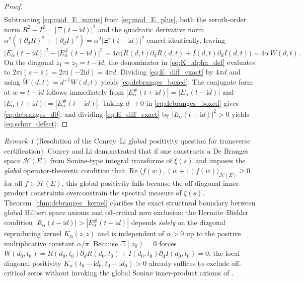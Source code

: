 \documentclass[11pt,reqno,a4paper]{amsart}
\theoremstyle{plain}
\theoremstyle{definition}
\theoremstyle{remark}
\newtheorem{remark}[theorem]{Remark}
\numberwithin{equation}{section}
\newcommand{\ii}{\mathrm{i}}
\begin{document}
\begin{proof}
\begin{align}
\end{align}
Subtracting \eqref{eq:mod_E_minus} from \eqref{eq:mod_E_plus}, both the zeroth-order norm $R^2 + I^2 = |\Xi(t-\ii d)|^2$ and the quadratic derivative norm $\alpha^2((\partial_d R)^2 + (\partial_d I)^2) = \alpha^2|\Xi'(t-\ii d)|^2$ cancel identically, leaving
\begin{equation}\label{eq:E_diff_exact}
  \big|E_\alpha(t - \ii d)\big|^2 - \big|E_\alpha^\#(t - \ii d)\big|^2
  = 4\alpha\big(R(d,t)\partial_d R(d,t) + I(d,t)\partial_d I(d,t)\big)
  = 4\alpha\,W(d,t).
\end{equation}
On the diagonal $z_1 = z_2 = t - \ii d$, the denominator in \eqref{eq:K_alpha_def} evaluates to $2\pi\ii(z - \bar{z}) = 2\pi\ii(-2\ii d) = 4\pi d$. Dividing \eqref{eq:E_diff_exact} by $4\pi d$ and using $\widetilde{W}(d,t) = d^{-1}W(d,t)$ yields \eqref{eq:debranges_boxed}. The conjugate form at $w = t + \ii d$ follows immediately from $|E_\alpha^\#(t+\ii d)| = |E_\alpha(t-\ii d)|$ and $|E_\alpha(t+\ii d)| = |E_\alpha^\#(t-\ii d)|$. Taking $d \to 0$ in \eqref{eq:debranges_boxed} gives \eqref{eq:debranges_d0}, and dividing \eqref{eq:E_diff_exact} by $|E_\alpha(t-\ii d)|^2 > 0$ yields \eqref{eq:schur_defect}.
\end{proof}

\begin{remark}[Resolution of the Conrey--Li global positivity question for transverse certification]\label{rem:conrey_li_resolution}
Conrey and Li \cite{ConreyLi2000} demonstrated that if one constructs a De Branges space $\mathcal{H}(E)$ from Sonine-type integral transforms of $\xi(s)$ and imposes the \emph{global} operator-theoretic condition that $\operatorname{Re}\langle f(w), (w+1)f(w)\rangle_{\mathcal{H}(E)} \ge 0$ for all $f \in \mathcal{H}(E)$, this global positivity fails because the off-diagonal inner-product constraints overconstrain the spectral measure of $\xi(s)$. Theorem~\ref{thm:debranges_kernel} clarifies the exact structural boundary between global Hilbert space axioms and off-critical zero exclusion: the Hermite--Biehler condition $|E_\alpha(t-\ii d)| > |E_\alpha^\#(t-\ii d)|$ depends \emph{solely} on the diagonal reproducing kernel $K_\alpha(z,z)$ and is independent of $\alpha > 0$ up to the positive multiplicative constant $\alpha/\pi$. Because $\Xi(z_0) = 0$ forces $W(d_0,t_0) = R(d_0,t_0)\partial_d R(d_0,t_0) + I(d_0,t_0)\partial_d I(d_0,t_0) = 0$, the local diagonal positivity $K_\alpha(t_0-\ii d_0, t_0-\ii d_0) > 0$ already suffices to exclude off-critical zeros without invoking the global Sonine inner-product axioms of \cite{ConreyLi2000}.
\end{remark}
\end{document}

